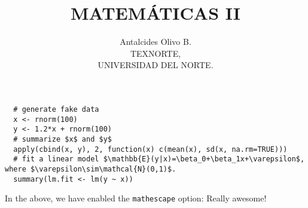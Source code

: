 \documentclass[xcolor=pdftex, x11names,table,openany]{book}
\begin{document}
\title{MATEM\'ATICAS II}

\author{Antalcides Olivo B.\\
{\helv TEXNORTE,\\
\vspace{-0.4cm}
UNIVERSIDAD DEL NORTE.}}
 \maketitle

 \tableofcontents

\begin{verbatim}
  # generate fake data
  x <- rnorm(100)
  y <- 1.2*x + rnorm(100)
  # summarize $x$ and $y$
  apply(cbind(x, y), 2, function(x) c(mean(x), sd(x, na.rm=TRUE)))
  # fit a linear model $\mathbb{E}(y|x)=\beta_0+\beta_1x+\varepsilon$, where $\varepsilon\sim\mathcal{N}(0,1)$.
  summary(lm.fit <- lm(y ~ x))
\end{verbatim}

In the above, we have enabled the \verb|mathescape| option: Really awesome!
\vspace*{2em}
\end{document}
